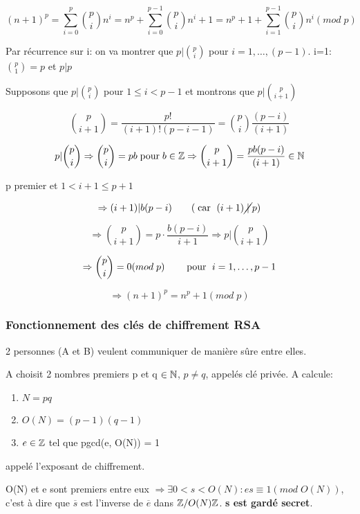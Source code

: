 \begin{demo}
\[
(n+1)^p = \sum_{i=0}^p {p \choose i} n^i = n^p + \sum_{i=0}^{p-1} {p \choose i} n^i + 1 = n^p + 1 + \sum_{i=1}^{p-1} {p \choose i} n^i (mod \; p)
\]

Par récurrence sur i: on va montrer que $p|{p \choose i}$ pour $i=1,\ldots,(p-1)$. i=1: ${p \choose 1} = p$ et $p|p$

Supposons que $p|{p \choose i}$ pour $1 \leq i < p-1$ et montrons que $p|{p \choose i+1}$

\[ {p \choose i+1} = \frac{p!}{(i+1)!(p-i-1)} = {p \choose i} \frac{(p-i)}{(i+1)} \]

\[ p|{p \choose i} \Rightarrow {p \choose i} = pb \text{\;pour\;} b\in\mathbb{Z} \Rightarrow {p \choose i+1} = \frac{pb(p-i)}{(i+1)} \in \mathbb{N} \]

p premier et $1 < i+1 \leq p+1$

\[ \Rightarrow (i+1)|b(p-i) \qquad (\text{\;car \;}(i+1)\cancel{\;|\;}p) \]

\[ \Rightarrow {p \choose i+1} = p\cdot \frac{b(p-i)}{i+1} \Rightarrow p|{p \choose i+1} \]

\[ \Rightarrow {p \choose i} = 0(mod\; p) \qquad \text{\;pour \;} i=1,\ldots,p-1 \]

\[ \Rightarrow (n+1)^p = n^p + 1(mod\; p) \]

\end{demo}

\subsubsection{Fonctionnement des clés de chiffrement RSA}

2 personnes (A et B) veulent communiquer de manière sûre entre elles.

A choisit 2 nombres premiers p et q $\in \mathbb{N}$, $p \neq q$, appelés clé privée. A calcule:

\begin{enumerate}
\item $N = pq$
\item $O(N) = (p-1)(q-1)$
\item $e \in \mathbb{Z}$ tel que pgcd(e, O(N)) = 1
\end{enumerate}

appelé l'exposant de chiffrement.

O(N) et e sont premiers entre eux $\Rightarrow \exists 0 < s < O(N): es \equiv 1(mod\;O(N))$, c'est à dire que $\overline{s}$ est l'inverse de $\overline{e}$ dans $\mathbb{Z}/O(N)\mathbb{Z}$. \textbf{s est gardé secret}. 

